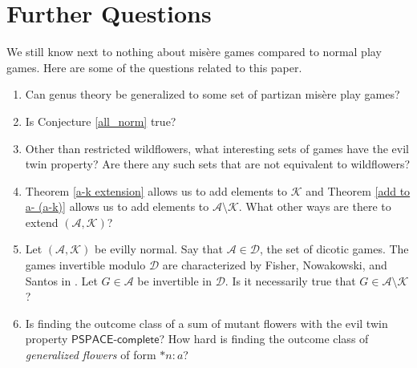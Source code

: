 \documentclass{amsart}
\theoremstyle{plain}
\theoremstyle{definition}
\theoremstyle{remark}
\numberwithin{equation}{section}
\numberwithin{thm}{section}
\begin{document}
\section{Further Questions}  
\label{7}
We still know next to nothing about mis\`ere games compared to normal play games. Here are some of the questions related to this paper.
\begin{enumerate}
    \item Can genus theory be generalized to some set of partizan mis\`ere play games?
    \item Is Conjecture \ref{all_norm} true?
    \item   Other than restricted wildflowers, what interesting sets of games have the evil twin property? Are there any such sets that are not equivalent to wildflowers?
    \item  Theorem \ref{a-k extension} allows us to add elements to $\mathscr{K}$ and Theorem \ref{add to a- (a-k)} allows us to add elements to $\mathscr{A}\setminus\mathscr{K}$. What other ways are there to extend $(\mathscr{A},\mathscr{K})$?
    \item Let $(\mathscr{A},\mathscr{K})$ be evilly normal. Say that $\mathscr{A} \in \mathcal{D}$, the set of dicotic games. The games invertible modulo $\mathcal{D}$ are characterized by Fisher, Nowakowski, and Santos in \cite{dicoticinvertible}. Let $G \in \mathscr{A}$ be invertible in $\mathcal{D}$. Is it necessarily true that $G \in \mathscr{A} \setminus \mathscr{K}$?
    \item   Is finding the outcome class of a sum of mutant flowers with the evil twin property $\mathsf{PSPACE\text{-}complete}$? How hard is finding the outcome class of \emph{generalized flowers} of form $*n:a$?
\end{enumerate}
\printbibliography 
\end{document}
